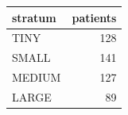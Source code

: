 \begin{tabular}{lr}
\toprule
stratum & patients \\
\midrule
TINY & 128 \\
SMALL & 141 \\
MEDIUM & 127 \\
LARGE & 89 \\
\bottomrule
\end{tabular}
